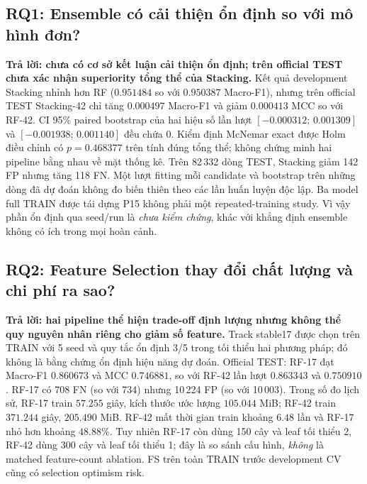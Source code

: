\subsection{RQ1: Ensemble có cải thiện ổn định so với mô hình đơn?}
\label{sec:revision-rq1}
\textbf{Trả lời: chưa có cơ sở kết luận cải thiện ổn định; trên official TEST chưa xác nhận superiority tổng thể của Stacking.}
Kết quả development Stacking nhỉnh hơn RF ($0.951484$ so với $0.950387$ Macro-F1), nhưng trên official TEST Stacking-42 chỉ tăng $0.000497$ Macro-F1 và giảm $0.000413$ MCC so với RF-42. CI 95\% paired bootstrap của hai hiệu số lần lượt $[-0.000312;\,0.001309]$ và $[-0.001938;\,0.001140]$ đều chứa 0. Kiểm định McNemar exact được Holm điều chỉnh có $p=0.468377$ trên tính đúng tổng thể; không chứng minh hai pipeline bằng nhau về mặt thống kê. Trên 82\,332 dòng TEST, Stacking giảm 142 FP nhưng tăng 118 FN.
Một lượt fitting mỗi candidate và bootstrap trên những dòng đã dự đoán không đo biến thiên theo các lần huấn luyện độc lập. Ba model full TRAIN được tái dựng P15 không phải một repeated-training study. Vì vậy phần ổn định qua seed/run là \emph{chưa kiểm chứng}, khác với khẳng định ensemble không có ích trong mọi hoàn cảnh.

\subsection{RQ2: Feature Selection thay đổi chất lượng và chi phí ra sao?}
\label{sec:revision-rq2}
\textbf{Trả lời: hai pipeline thể hiện trade-off định lượng nhưng không thể quy nguyên nhân riêng cho giảm số feature.}
Track stable17 được chọn trên TRAIN với 5 seed và quy tắc ổn định 3/5 trong tối thiểu hai phương pháp; đó không là bằng chứng ổn định hiệu năng dự đoán. Official TEST: RF-17 đạt Macro-F1 $0.860673$ và MCC $0.746881$, so với RF-42 lần lượt $0.863343$ và $0.750910$. RF-17 có 708 FN (so với 734) nhưng 10\,224 FP (so với 10\,003).
Trong số đo lịch sử, RF-17 train $57.255$ giây, kích thước ước lượng $105.044$ MiB; RF-42 train $371.244$ giây, $205.490$ MiB. RF-42 mất thời gian train khoảng $6.48$ lần và RF-17 nhỏ hơn khoảng $48.88$\%. Tuy nhiên RF-17 còn dùng 150 cây và leaf tối thiểu 2, RF-42 dùng 300 cây và leaf tối thiểu 1; đây là so sánh cấu hình, \emph{không} là matched feature-count ablation. FS trên toàn TRAIN trước development CV cũng có selection optimism risk.

